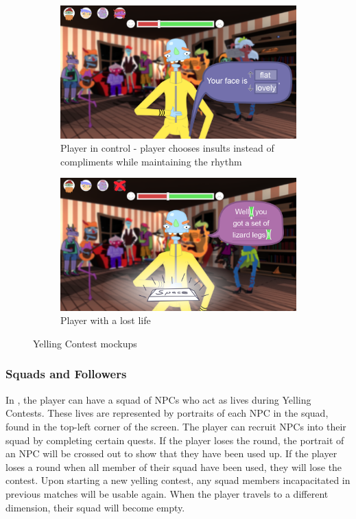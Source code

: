 \begin{figure}[H]
  \begin{subfigure}{.44\textwidth}
    \centering
    \includegraphics[width=.9\linewidth]{images/UI_yelling_offense}
    \caption{Player in control - player chooses insults instead of compliments while maintaining the rhythm}
    \label{fig:yelling_contest_c}
  \end{subfigure} %
	\begin{subfigure}{.44\textwidth}
	  \centering
	  \includegraphics[width=.9\linewidth]{images/UI_yelling_lifelost}
	  \caption{Player with a lost life}
	  \label{fig:yelling_contest_c}
	\end{subfigure}%
  \caption{Yelling Contest mockups}
  \label{fig:yelling_contest}
\end{figure}

\subsubsection{Squads and Followers}
In \ourgame{}, the player can have a squad of NPCs who act as lives during Yelling Contests. These lives are represented by portraits of each NPC in the squad, found in the top-left corner of the screen. The player can recruit NPCs into their squad by completing certain quests. If the player loses the round, the portrait of an NPC will be crossed out to show that they have been used up. If the player loses a round when all member of their squad have been used, they will lose the contest. Upon starting a new yelling contest, any squad members incapacitated in previous matches will be usable again. When the player travels to a different dimension, their squad will become empty.


